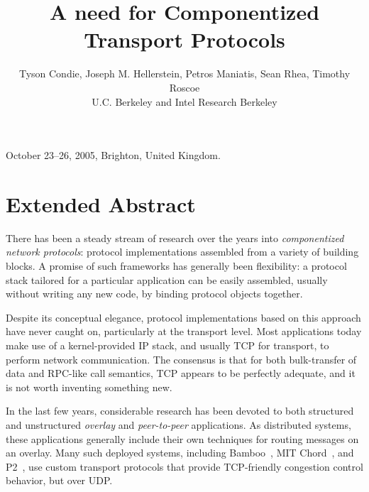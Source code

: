 \documentclass{sig-alt-full}
\newcommand{\note}[1]{}
\begin{document}
 

 {October 23--26, 2005, Brighton, United Kingdom.}

\title{A need for Componentized Transport Protocols}
\author{Tyson Condie, Joseph M. Hellerstein, Petros Maniatis, 
             Sean Rhea, Timothy Roscoe \\
             U.C. Berkeley and Intel Research Berkeley}
\maketitle

\section{Extended Abstract}
\label{sec:intro}

\note{Outline: This is a topic of long interest.}

There has been a steady stream of research over the years into
\emph{componentized network protocols}: protocol 
implementations assembled from a variety of building blocks.  A 
promise of such frameworks has generally been
flexibility: a protocol stack tailored for a particular application
can be easily assembled, usually without writing any new code, by
binding protocol objects together. 

\note{Outline: But the interest has yet to translate to application.}

Despite its conceptual elegance, protocol
implementations based on this approach have never
caught on, particularly at the transport level.  Most applications today make use 
of a kernel-provided IP stack, and usually TCP for transport, to perform network
communication. The consensus is that for both bulk-transfer of data and RPC-like call semantics, 
TCP appears to be perfectly adequate, and it is not worth inventing something new.

\note{Paper outline Part 1: look at new apps with custom transport} 

In the last few years, considerable research has been devoted to both 
structured and unstructured \emph{overlay} and \emph{peer-to-peer} 
applications.  As distributed systems, these applications generally include their 
own techniques for routing messages on an overlay.   Many such deployed
systems, including Bamboo~\cite{rhea_usenix_2004}, MIT
Chord~\cite{chord}, and P2~\cite{p2:sosp}, use custom transport 
protocols that provide TCP-friendly congestion control behavior, but over UDP.
\end{document}
